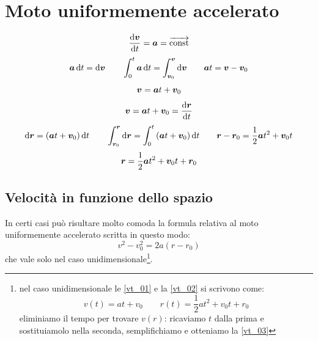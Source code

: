 \section{Moto uniformemente accelerato}
\begin{equation*}\frac{\mathrm{d} \boldsymbol{v}}{\mathrm{d} t}=\boldsymbol{a}=\overrightarrow{\text{const}}\end{equation*}
\begin{equation*}\boldsymbol{a}\,\mathrm{d} t=\mathrm{d} \boldsymbol{v}\qquad\int_0^t\boldsymbol{a}\,\mathrm{d} t=\int_{\boldsymbol{v}_0}^{\boldsymbol{v}}\mathrm{d} \boldsymbol{v}\qquad\boldsymbol{a} t=\boldsymbol{v}-\boldsymbol{v}_0\end{equation*}
\begin{equation}
\boldsymbol{v}=\boldsymbol{a} t+\boldsymbol{v}_0
\label{vt_01}
\end{equation}
\begin{equation*}\boldsymbol{v}=\boldsymbol{a} t+\boldsymbol{v}_0=\frac{\mathrm{d} \boldsymbol{r}}{\mathrm{d} t}\end{equation*}
\begin{equation*}\mathrm{d} \boldsymbol{r}=\left(\boldsymbol{a} t+\boldsymbol{v}_0\right)\mathrm{d} t\qquad\int_{\boldsymbol{r}_0}^{\boldsymbol{r}}\mathrm{d} \boldsymbol{r}=\int_0^t\left(\boldsymbol{a} t+\boldsymbol{v}_0\right)\mathrm{d} t\qquad\boldsymbol{r}-\boldsymbol{r}_0=\frac{1}{2}\boldsymbol{a} t^2+\boldsymbol{v}_0 t\end{equation*}
\begin{equation}
\boldsymbol{r}=\frac{1}{2}\boldsymbol{a} t^2+\boldsymbol{v}_0 t+\boldsymbol{r}_0
\label{vt_02}
\end{equation}
\subsection{Velocità in funzione dello spazio}
In certi casi può risultare molto comoda la formula relativa al
moto uniformemente accelerato scritta in questo modo:
\begin{equation}
v^2-v_0^2=2a(r-r_0)
\label{vt_03}
\end{equation}
che vale solo nel caso unidimensionale\footnote{nel caso unidimensionale le \eqref{vt_01} e la \eqref{vt_02} si scrivono come:
\begin{equation}
v(t)=at+v_0\qquad r(t)=\frac{1}{2}at^2+v_0t+r_0
\end{equation}
eliminiamo il tempo per trovare $v(r)$: ricaviamo $t$ dalla prima e sostituiamolo nella seconda, semplifichiamo e otteniamo la \eqref{vt_03}}.
